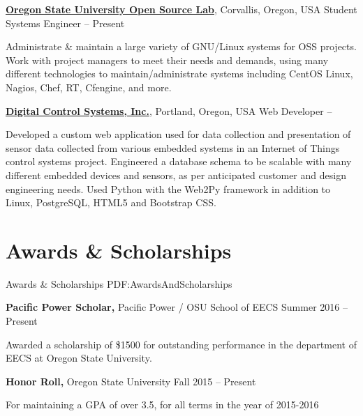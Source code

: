 \documentclass[letterpaper,MMMyyyy,nonstop]{simpleresumecv}
\begin{document}
\begin{body}
\href{http://www.osuosl.org}
{\textbf{Oregon State University Open Source Lab}},
Corvallis, Oregon, USA
\GapNoBreak
\BulletItem
Student Systems Engineer
\hfill
{} --
Present
\begin{detail}
\SubBulletItem
Administrate \& maintain a large variety of GNU/Linux systems for OSS projects.
\SubBulletItem
Work with project managers to meet their needs and demands, using many different technologies to maintain/administrate systems including CentOS Linux, Nagios, Chef, RT, Cfengine, and more.
\end{detail}

\href{http://www.dcs-inc.net}
{\textbf{Digital Control Systems, Inc.}},
Portland, Oregon, USA
\GapNoBreak
\BulletItem
Web Developer
\hfill
{} --
\begin{detail}
\SubBulletItem
Developed a custom web application used for data collection and presentation of sensor data collected from various embedded systems in an Internet of Things control systems project.
\SubBulletItem
Engineered a database schema to be scalable with many different embedded devices and sensors, as per anticipated customer and design engineering needs.
\SubBulletItem
Used Python with the Web2Py framework in addition to Linux, PostgreSQL, HTML5 and Bootstrap CSS.
\end{detail}


\section
{Awards \&\newline
Scholarships}
{Awards \& Scholarships}
{PDF:AwardsAndScholarships}

\textbf{Pacific Power Scholar,}
Pacific Power / OSU School of EECS
\hfill
Summer 2016 -- Present
\GapNoBreak
\begin{detail}
\BulletItem
Awarded a scholarship of \$1500 for outstanding performance in the department of EECS at Oregon State University.
\end{detail}

\textbf{Honor Roll,}
Oregon State University
\hfill
Fall 2015 -- Present
\GapNoBreak
\begin{detail}
\BulletItem
For maintaining a GPA of over 3.5, for all terms in the year of 2015-2016
\end{detail}


\end{body}
\end{document}
